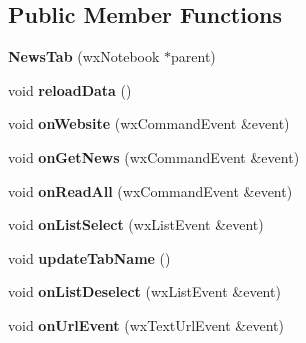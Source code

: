 \subsection*{Public Member Functions}
\begin{DoxyCompactItemize}
\item 
\hypertarget{struct_news_tab_a26891e84a277b53155d728a81656788b}{{\bfseries News\-Tab} (wx\-Notebook $\ast$parent)}\label{struct_news_tab_a26891e84a277b53155d728a81656788b}

\item 
\hypertarget{struct_news_tab_ad1beae83135fabcb9f273986cffb652e}{void {\bfseries reload\-Data} ()}\label{struct_news_tab_ad1beae83135fabcb9f273986cffb652e}

\item 
\hypertarget{struct_news_tab_ae1db997ca2fb9a030a6e26a1229f4916}{void {\bfseries on\-Website} (wx\-Command\-Event \&event)}\label{struct_news_tab_ae1db997ca2fb9a030a6e26a1229f4916}

\item 
\hypertarget{struct_news_tab_a8cd14a0315d4c2474a5a7f174cef1766}{void {\bfseries on\-Get\-News} (wx\-Command\-Event \&event)}\label{struct_news_tab_a8cd14a0315d4c2474a5a7f174cef1766}

\item 
\hypertarget{struct_news_tab_a2e62d6db19c9c0ea19796f6907eed2ce}{void {\bfseries on\-Read\-All} (wx\-Command\-Event \&event)}\label{struct_news_tab_a2e62d6db19c9c0ea19796f6907eed2ce}

\item 
\hypertarget{struct_news_tab_a64ebd2fda35c1db71c8f1443b61368a2}{void {\bfseries on\-List\-Select} (wx\-List\-Event \&event)}\label{struct_news_tab_a64ebd2fda35c1db71c8f1443b61368a2}

\item 
\hypertarget{struct_news_tab_a3fbd97fa384fd8ea6a04a14c33b9897d}{void {\bfseries update\-Tab\-Name} ()}\label{struct_news_tab_a3fbd97fa384fd8ea6a04a14c33b9897d}

\item 
\hypertarget{struct_news_tab_ad2748bcf03633e621ac3cc1da08700c3}{void {\bfseries on\-List\-Deselect} (wx\-List\-Event \&event)}\label{struct_news_tab_ad2748bcf03633e621ac3cc1da08700c3}

\item 
\hypertarget{struct_news_tab_a32e0ad41f8d49e689816e08d52f43ee0}{void {\bfseries on\-Url\-Event} (wx\-Text\-Url\-Event \&event)}\label{struct_news_tab_a32e0ad41f8d49e689816e08d52f43ee0}


\end{DoxyCompactItemize}
